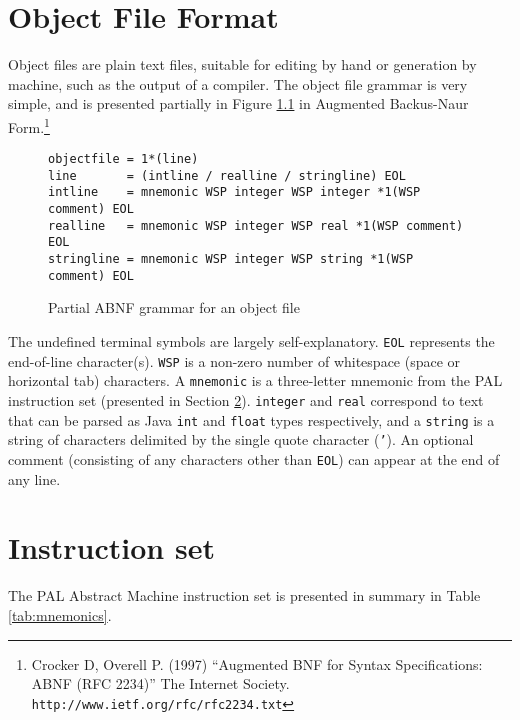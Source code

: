 \documentclass[a4paper,10pt]{report}
\begin{document}
\chapter{Object File Format}
\label{sec:objectfile}
Object files are plain text files, suitable for editing by hand or
generation by machine, such as the output of a compiler.  The object
file grammar is very simple, and is presented partially in Figure
\ref{fig:objgrammar} in Augmented Backus-Naur Form.\footnote{Crocker
  D, Overell P. (1997) ``Augmented BNF for Syntax Specifications: ABNF
  (RFC 2234)'' The Internet Society.
  \texttt{http://www.ietf.org/rfc/rfc2234.txt}}

\begin{figure}[ht]
  \centering
  \begin{verbatim}
objectfile = 1*(line)
line       = (intline / realline / stringline) EOL
intline    = mnemonic WSP integer WSP integer *1(WSP comment) EOL
realline   = mnemonic WSP integer WSP real *1(WSP comment) EOL
stringline = mnemonic WSP integer WSP string *1(WSP comment) EOL
\end{verbatim}
  \caption{Partial ABNF grammar for an object file}
  \label{fig:objgrammar}
\end{figure}

The undefined terminal symbols are largely self-explanatory.
\texttt{EOL} represents the end-of-line character(s).  \texttt{WSP} is
a non-zero number of whitespace (space or horizontal tab) characters.
A \texttt{mnemonic} is a three-letter mnemonic from the PAL
instruction set (presented in Section \ref{sec:mnemonics}).
\texttt{integer} and \texttt{real} correspond to text that can be
parsed as Java \texttt{int} and \texttt{float} types respectively, and
a \texttt{string} is a string of characters delimited by the single
quote character (\texttt{'}).  An optional comment (consisting of any
characters other than \texttt{EOL}) can appear at the end of any line.

\chapter{Instruction set}
\label{sec:mnemonics}
The PAL Abstract Machine instruction set is presented in summary in
Table \ref{tab:mnemonics}.
\end{document}
